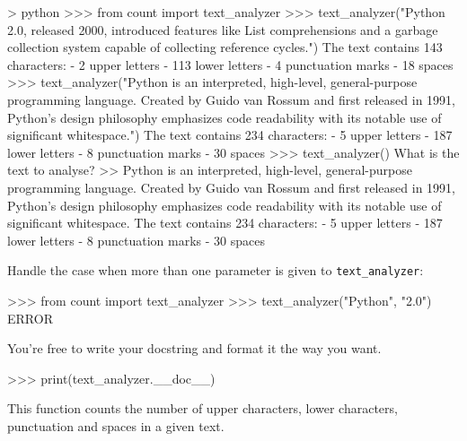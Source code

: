 \documentclass[]{article}
\newenvironment{Shaded}{\begin{snugshade}}{\end{snugshade}}
\newcommand{\NormalTok}[1]{\textcolor[rgb]{0.81,0.81,0.76}{#1}}
\begin{document}
\begin{Shaded}
\begin{Highlighting}[]
\NormalTok{> python}
\NormalTok{>>> from count import text_analyzer}
\NormalTok{>>> text_analyzer("Python 2.0, released 2000, introduced }
\NormalTok{features like List comprehensions and a garbage collection}
\NormalTok{system capable of collecting reference cycles.")}
\NormalTok{The text contains 143 characters:}
\NormalTok{- 2 upper letters}
\NormalTok{- 113 lower letters}
\NormalTok{- 4 punctuation marks}
\NormalTok{- 18 spaces}
\NormalTok{>>> text_analyzer("Python is an interpreted, high-level,}
\NormalTok{general-purpose programming language. Created by Guido van}
\NormalTok{Rossum and first released in 1991, Python's design philosophy}
\NormalTok{emphasizes code readability with its notable use of significant}
\NormalTok{whitespace.")}
\NormalTok{The text contains 234 characters:}
\NormalTok{- 5 upper letters}
\NormalTok{- 187 lower letters}
\NormalTok{- 8 punctuation marks}
\NormalTok{- 30 spaces}
\NormalTok{>>> text_analyzer()}
\NormalTok{What is the text to analyse?}
\NormalTok{>> Python is an interpreted, high-level, general-purpose}
\NormalTok{programming language. Created by Guido van Rossum and first}
\NormalTok{released in 1991, Python's design philosophy emphasizes code}
\NormalTok{readability with its notable use of significant whitespace.}
\NormalTok{The text contains 234 characters:}
\NormalTok{- 5 upper letters}
\NormalTok{- 187 lower letters}
\NormalTok{- 8 punctuation marks}
\NormalTok{- 30 spaces}
\end{Highlighting}
\end{Shaded}

Handle the case when more than one parameter is given to
\texttt{text\_analyzer}:

\begin{Shaded}
\begin{Highlighting}[]
\NormalTok{>>> from count import text_analyzer}
\NormalTok{>>> text_analyzer("Python", "2.0")}
\NormalTok{ERROR}
\end{Highlighting}
\end{Shaded}

You're free to write your docstring and format it the way you want.

\begin{Shaded}
\begin{Highlighting}[]
\NormalTok{>>> print(text_analyzer.__doc__)}

\NormalTok{    This function counts the number of upper characters, lower characters,}
\NormalTok{    punctuation and spaces in a given text.}
\end{Highlighting}
\end{Shaded}
\end{document}
